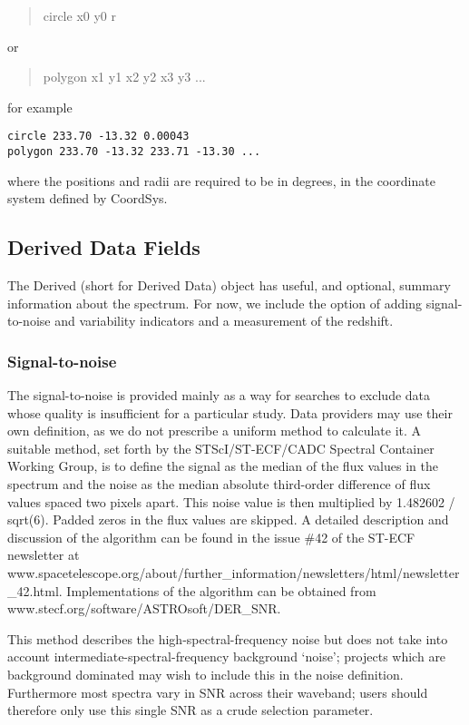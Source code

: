 \documentclass[11pt]{article}
\begin{document}
\begin{quote}
circle x0 y0 r
\end{quote}
or
\begin{quote}
polygon x1 y1 x2 y2 x3 y3 ...
\end{quote}
for example
\begin{verbatim}
circle 233.70 -13.32 0.00043
polygon 233.70 -13.32 233.71 -13.30 ...
\end{verbatim}
where the positions and radii are required to be in degrees, in the coordinate
system defined by CoordSys.


\subsection{Derived Data Fields}

The Derived (short for Derived Data) object has useful, and optional, summary information
about the spectrum. For now, we include the option of adding
signal-to-noise and variability indicators and a measurement of the
redshift.

\subsubsection{Signal-to-noise}

The signal-to-noise is provided mainly as a way for searches to
exclude data whose quality is insufficient for a particular
study. Data providers may use their own definition, as we do not
prescribe a uniform method to calculate it. A suitable method,
set forth by the STScI/ST-ECF/CADC Spectral Container Working Group, is
to define the signal as the median of the flux values in the spectrum
and the noise as the median absolute third-order difference of flux
values spaced two pixels apart. This noise value is then multiplied by
1.482602 / sqrt(6). Padded zeros in the flux values are skipped. A
detailed description and discussion of the algorithm can be found in the
issue \#42 of the ST-ECF newsletter at
www.spacetelescope.org/about/further\_information/newsletters/html/newsletter\_42.html.
Implementations of the algorithm can be obtained from
www.stecf.org/software/ASTROsoft/DER\_SNR. 

This method describes the high-spectral-frequency noise
but does not take into account intermediate-spectral-frequency 
background `noise'; projects which are background dominated
may wish to include this in the noise definition. Furthermore
most spectra vary in SNR across their waveband; users
should therefore only use this single SNR as a crude selection
parameter.
\end{document}

